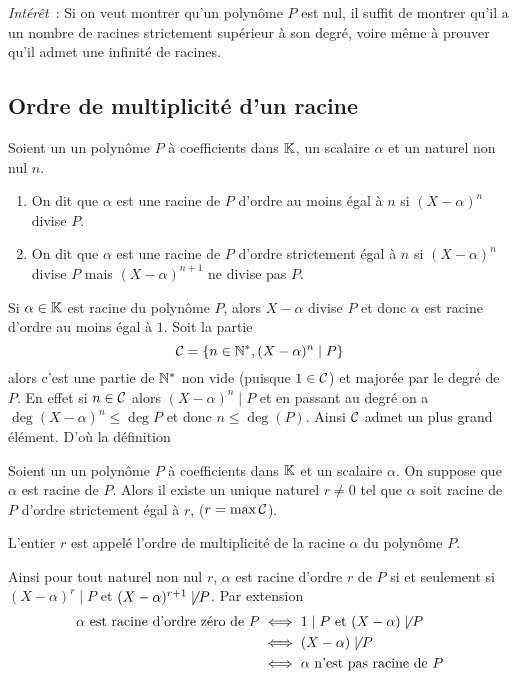 \emph{Intérêt}~: Si on veut montrer qu'un polynôme \(P\) est nul, il suffit de
montrer qu'il a un nombre de racines strictement supérieur à son degré, voire
même à prouver qu'il admet une infinité de racines.

\subsection{Ordre de multiplicité d'un racine}

\begin{defdef}
  Soient un un polynôme \(P\) à coefficients dans \(\mathbb{K}\), un scalaire \(\alpha\)
  et un naturel non nul \(n\).
  \begin{enumerate}
    \item On dit que \(\alpha\) est une racine de \(P\) d'ordre au moins égal à
      \(n\) si \((X-\alpha)^n\) divise \(P\).
    \item On dit que \(\alpha\) est une racine de \(P\) d'ordre strictement égal
      à \(n\) si \((X-\alpha)^n\) divise \(P\) mais \((X-\alpha)^{n+1}\) ne
      divise pas \(P\).
  \end{enumerate}
\end{defdef}

Si \(\alpha \in \mathbb{K}\) est racine du polynôme \(P\), alors \(X-\alpha\) divise
\(P\) et donc \(\alpha\) est racine d'ordre au moins égal à \(1\). Soit la
partie
\begin{equation}
  \mathcal{C} = \{n \in \mathbb{N}^*, (X-\alpha)^n \mid{} P\}
\end{equation}
alors c'est une partie de \(\mathbb{N}^*\) non vide (puisque \(1 \in \mathcal{C}\)) et
majorée par le degré de \(P\). En effet si \(n \in \mathcal{C}\) alors
\((X-\alpha)^n \mid{} P\) et en passant au degré on a \(\deg(X-\alpha)^n
\leqslant \deg P\) et donc \(n \leqslant \deg(P)\). Ainsi \(\mathcal{C}\) admet un
plus grand élément. D'où la définition

\begin{defdef}
  Soient un un polynôme \(P\) à coefficients dans \(\mathbb{K}\) et un scalaire
  \(\alpha\). On suppose que \(\alpha\) est racine de \(P\). Alors il existe un
  unique naturel \(r \neq 0\) tel que \(\alpha\) soit racine de \(P\) d'ordre
  strictement égal à \(r\), (\(r = \max \mathcal{C}\)).

L'entier \(r\) est appelé l'ordre de multiplicité de la racine \(\alpha\) du
polynôme \(P\). \end{defdef}

Ainsi pour tout naturel non nul \(r\), \(\alpha\) est racine d'ordre \(r\) de
\(P\) si et seulement si \((X-\alpha)^r \mid{} P\) et \((X-\alpha)^{r+1}
\not\mid{} P\). Par extension
\begin{align}
  \alpha \text{~est racine d'ordre zéro de~} P &\iff 1\mid{}P \text{~et~}
  (X-\alpha) \not\mid{} P \\
  &\iff (X-\alpha) \not\mid{} P\\
  &\iff \alpha \text{~n'est pas racine de~} P
\end{align}

